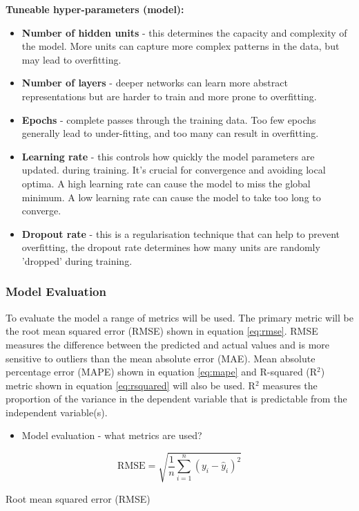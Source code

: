 \textbf{Tuneable hyper-parameters (model):}
\begin{itemize}
    \item \textbf{Number of hidden units} - this determines the capacity and complexity of the model. More units can capture more complex patterns in the data, but may lead to overfitting.
    \item \textbf{Number of layers} - deeper networks can learn more abstract representations but are harder to train and more prone to overfitting.
    \item \textbf{Epochs} - complete passes through the training data. Too few epochs generally lead to under-fitting, and too many can result in overfitting.
    \item \textbf{Learning rate} - this controls how quickly the model parameters are updated. during training. It's crucial for convergence and avoiding local optima. A high learning rate can cause the model to miss the global minimum. A low learning rate can cause the model to take too long to converge.
    \item \textbf{Dropout rate} - this is a regularisation technique that can help to prevent overfitting, the dropout rate determines how many units are randomly 'dropped' during training.
\end{itemize}

\subsubsection{Model Evaluation}

To evaluate the model a range of metrics will be used. The primary metric will be the root mean squared error (RMSE) shown in equation \ref{eq:rmse}. RMSE measures the difference between the predicted and actual values and is more sensitive to outliers than the mean absolute error (MAE). Mean absolute percentage error (MAPE) shown in equation \ref{eq:mape} and R-squared (R$^2$) metric shown in equation \ref{eq:rsquared} will also be used. R$^2$ measures the proportion of the variance in the dependent variable that is predictable from the independent variable(s).

\begin{itemize}
    \item Model evaluation - what metrics are used?
\end{itemize}

\begin{eqfloat}[H]
    \begin{equation}
        \text{RMSE} = \sqrt{\frac{1}{n}\sum_{i=1}^{n}(y_i - \hat{y}_i)^2}
        \label{eq:rmse}
    \end{equation}
    \caption{Root mean squared error (RMSE)}
\end{eqfloat}

